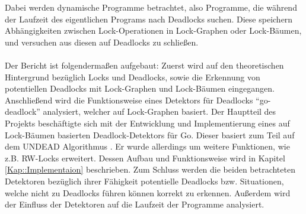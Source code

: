 Dabei werden 
dynamische Programme betrachtet, also Programme, die während der Laufzeit des 
eigentlichen Programs nach Deadlocks suchen. Diese speichern Abhängigkeiten 
zwischen Lock-Operationen in Lock-Graphen oder Lock-Bäumen, und versuchen aus 
diesen auf Deadlocks zu schließen.\\\\
Der Bericht ist folgendermaßen aufgebaut: Zuerst wird auf den theoretischen 
Hintergrund bezüglich Locks und Deadlocks, sowie die Erkennung von 
potentiellen Deadlocks mit Lock-Graphen und Lock-Bäumen eingegangen. Anschließend
wird die Funktionsweise eines Detektors für Deadlocks ``go-deadlock'' 
\cite{sasha-s} analysiert, welcher auf Lock-Graphen basiert. Der Hauptteil 
des Projekts beschäftigte sich mit der Entwicklung und Implementierung eines 
auf Lock-Bäumen basierten Deadlock-Detektors für Go. Dieser basiert zum Teil 
auf dem UNDEAD Algorithmus \cite{zhou}. Er wurde allerdings um weitere Funktionen,
wie z.B. RW-Locks erweitert. Dessen Aufbau und Funktionsweise wird in Kapitel 
\ref{Kap::Implementaion} beschrieben. Zum Schluss werden die beiden betrachteten 
Detektoren bezüglich ihrer Fähigkeit potentielle Deadlocks bzw. 
Situationen, welche nicht zu Deadlocks führen können korrekt zu erkennen. Außerdem 
wird der Einfluss der Detektoren auf die Laufzeit der Programme analysiert.

